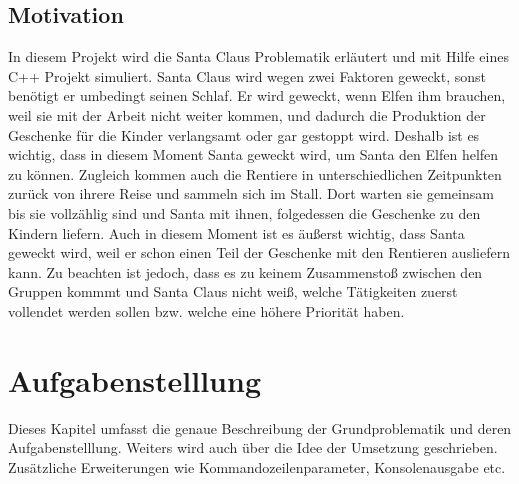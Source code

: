 \documentclass[a4paper,12pt]{exam}
\begin{document}
\subsection{Motivation}
In diesem Projekt wird die Santa Claus Problematik erläutert und mit Hilfe eines C++ Projekt simuliert. Santa Claus wird wegen 
zwei Faktoren geweckt, sonst benötigt er umbedingt seinen Schlaf. Er wird geweckt, wenn Elfen ihm brauchen, weil sie mit der Arbeit
nicht weiter kommen, und dadurch die Produktion der Geschenke für die Kinder verlangsamt oder gar gestoppt wird. Deshalb ist es wichtig, dass 
in diesem Moment Santa geweckt wird, um Santa den Elfen helfen zu können. Zugleich kommen auch die Rentiere in unterschiedlichen Zeitpunkten zurück von ihrere Reise und sammeln sich im Stall.
Dort warten sie gemeinsam bis sie vollzählig sind und Santa mit ihnen, folgedessen die Geschenke zu den Kindern liefern. Auch in diesem Moment ist es
äußerst wichtig, dass Santa geweckt wird, weil er schon einen Teil der Geschenke mit den Rentieren ausliefern kann. Zu beachten ist jedoch, dass es zu keinem Zusammenstoß zwischen den Gruppen kommmt
und Santa Claus nicht weiß, welche Tätigkeiten zuerst vollendet werden sollen bzw. welche eine höhere Priorität haben.
\newpage

\section{Aufgabenstelllung}
Dieses Kapitel umfasst die genaue Beschreibung der Grundproblematik und deren Aufgabenstelllung. Weiters wird auch über die Idee der Umsetzung geschrieben. Zusätzliche Erweiterungen wie
Kommandozeilenparameter, Konsolenausgabe etc.
\end{document}
